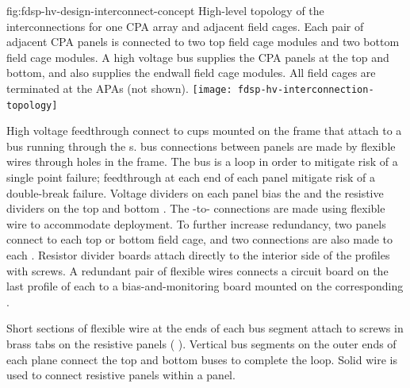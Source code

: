 \begin{dunefigure}{fig:fdsp-hv-design-interconnect-concept}
  {High-level topology of the  interconnections for one CPA array and adjacent field cages. Each pair of adjacent CPA panels is connected to two top field cage modules and two bottom field cage modules. A high voltage bus supplies the CPA panels at the top and bottom, and also supplies the endwall field cage modules. All field cages are terminated at the APAs (not shown).}
  \texttt{[image: fdsp-hv-interconnection-topology]}
\end{dunefigure}

High voltage feedthrough connect to cups mounted on the  frame
that attach to a  bus running through the s.   bus connections
between  panels are made by flexible wires through holes in the
 frame. The  bus is a loop in order to mitigate risk of a single
point failure; feedthrough at each end of each  panel mitigate
risk of a double-break failure.  Voltage dividers on each  panel
bias the  and the resistive dividers on the top
and bottom .  The -to- connections are made using
flexible wire to accommodate  deployment.  To further
increase redundancy, two  panels connect to each top or bottom
field cage, and two connections are also made to each . Resistor divider boards attach directly to the interior side of
the  profiles with screws.   A redundant pair of flexible wires
connects a circuit board on the last profile of each  to a
bias-and-monitoring board mounted on the corresponding .

Short sections of flexible wire at the ends of each  bus segment
attach to screws in brass tabs on the  resistive panels ( ).
Vertical  bus segments on the outer ends of each  plane connect
the top and bottom  buses to complete the loop.  Solid wire is used
to connect resistive panels within a  panel.

